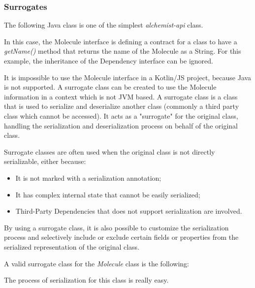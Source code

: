 \subsubsection{Surrogates}
\label{sssec:surrogates}
The following Java class is one of the simplest \textit{alchemist-api} class.



In this case, the Molecule interface is defining a contract for a class to have a \textit{getName()} method that returns the name of the Molecule as a String. For this example, the inheritance of the Dependency interface can be ignored.

It is impossible to use the Molecule interface in a Kotlin/JS project, because Java is not supported. A surrogate class can be created to use the Molecule information in a context which is not JVM based.
A surrogate class is a class that is used to serialize and deserialize another class (commonly a third party class which cannot be accessed). It acts as a "surrogate" for the original class, handling the serialization and deserialization process on behalf of the original class.

Surrogate classes are often used when the original class is not directly serializable, either because:
\begin{itemize}
	\item It is not marked with a serialization annotation;
	\item It has complex internal state that cannot be easily serialized;
	\item Third-Party Dependencies that does not support serialization are involved.
\end{itemize}
By using a surrogate class, it is also possible to customize the serialization process and selectively include or exclude certain fields or properties from the serialized representation of the original class.

A valid surrogate class for the \textit{Molecule} class is the following:



The process of serialization for this class is really easy.


